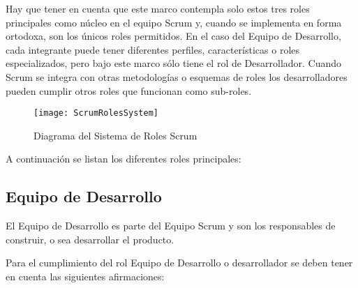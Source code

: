 Hay que tener en cuenta que este marco contempla solo estos tres roles principales como núcleo en el equipo Scrum y, cuando se implementa en forma ortodoxa, son los únicos roles permitidos. En el caso del Equipo de Desarrollo, cada integrante puede tener diferentes perfiles, características o roles especializados, pero bajo este marco sólo tiene el rol de Desarrollador. Cuando Scrum se integra con otras metodologías o esquemas de roles los desarrolladores pueden cumplir otros roles que funcionan como sub-roles.

\begin{figure}[h]
  \centering
  \texttt{[image: ScrumRolesSystem]}
  \caption{Diagrama del Sistema de Roles Scrum}
  \centering
  \label{fig:ScrumRolesSystem} %
\end{figure}
\FloatBarrier

A continuación se listan los diferentes roles principales:

\subsection{Equipo de Desarrollo}

El Equipo de Desarrollo es parte del Equipo Scrum y son los responsables de construir, o sea desarrollar el producto.
 
Para el cumplimiento del rol Equipo de Desarrollo o desarrollador se deben tener en cuenta las siguientes afirmaciones:

